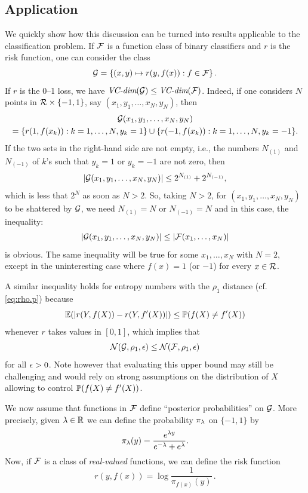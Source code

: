 \subsection{Application}
We quickly show how this discussion can be turned into results applicable to the classification problem.
If ${\mathcal F}$ is a function class of binary classifiers and $r$ is the risk function, one can consider the class
\[
{\mathcal G} = \{(x,y) \mapsto r(y, f(x)): f\in{\mathcal F}\}\,.
\]
If $r$ is the 0--1 loss, we have $\textit{VC-dim}({\mathcal G}) \leq \textit{VC-dim}({\mathcal F})$. Indeed, if one considers $N$ points in ${\mathcal R}\times \{-1,1\}$, say $(x_1, y_1, \ldots, x_N, y_N)$, then
\begin{multline*}
{\mathcal G}(x_1, y_1, \ldots, x_N, y_N) \\
= \{r(1, f(x_k)): k=1, \ldots, N, y_k=1\} \cup \{r(-1, f(x_k)): k=1, \ldots, N, y_k=-1\}.
\end{multline*}
If the two sets in the right-hand side are not empty, i.e., the numbers $N_{(1)}$ and $N_{(-1)}$ of $k$'s such that $y_k=1$ or $y_k=-1$ are not zero, then
\[
|{\mathcal G}(x_1, y_1, \ldots, x_N, y_N)| \leq 2^{N_{(1)}} + 2^{N_{(-1)}},
\]
which is less that $2^N$ as soon as $N>2$. So, taking $N>2$, for $(x_1, y_1, \ldots, x_N, y_N)$ to be shattered by ${\mathcal G}$, we need $N_{(1)}=N$ or $N_{(-1)} = N$ and in this case, the inequality:
\[
|{\mathcal G}(x_1, y_1, \ldots, x_N, y_N)| \leq |{\mathcal F}(x_1, \ldots, x_N)|
\]
is obvious.
The same inequality will be true for some $x_1, \ldots, x_N$ with $N=2$, except in the uninteresting case where $f(x) = 1$ (or $-1$) for every $x\in {\mathcal R}$. 

A similar inequality holds for entropy numbers with the $\rho_1$ distance (cf. \cref{eq:rho.p}) because 
\[
\bm{\mathbb E}(|r(Y,f(X)) - r(Y,f'(X))|) \leq \bm{\mathbb P}(f(X) \neq f'(X))
\]
whenever $r$ takes values in $[0,1]$, which implies that
\[
{\mathcal N}({\mathcal G}, \rho_1, \epsilon) \leq {\mathcal N}({\mathcal F}, \rho_1, \epsilon)
\]
for all $\epsilon>0$. Note however that evaluating this upper bound may still be challenging and would rely on strong assumptions on the distribution of $X$ allowing to control $\bm{\mathbb P}(f(X) \neq f'(X))$.


We now assume  that functions in ${\mathcal F}$ define ``posterior probabilities'' on ${\mathcal G}$.
 More precisely, given $\lambda \in {\mathbb{R}}$ we can define the probability $\pi_\lambda$ on $\{-1,1\}$ by
\[
\pi_\lambda(y) = \frac{e^{\lambda y}}{e^{-\lambda} + e^{\lambda}}.
\]
Now, if ${\mathcal F}$ is a class of {\em real-valued} functions, we can define the risk function
\[
r(y, f(x)) = \log \frac1{\pi_{f(x)}(y)}\,.
\]

